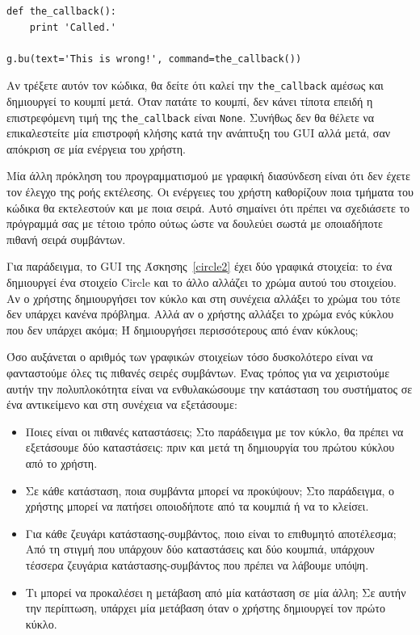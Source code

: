 \documentclass[10pt]{book}
\begin{document}
\begin{verbatim}
def the_callback():
    print 'Called.'

g.bu(text='This is wrong!', command=the_callback())
\end{verbatim}
%
Αν τρέξετε αυτόν τον κώδικα, θα δείτε ότι καλεί την \verb"the_callback" αμέσως και δημιουργεί
το κουμπί μετά.  Όταν πατάτε το κουμπί, δεν κάνει τίποτα επειδή η επιστρεφόμενη τιμή της \verb"the_callback"
είναι {\tt None}. Συνήθως δεν θα θέλετε να επικαλεστείτε μία επιστροφή κλήσης κατά την ανάπτυξη του GUI
αλλά μετά, σαν απόκριση σε μία ενέργεια του χρήστη.

Μία άλλη πρόκληση του προγραμματισμού με γραφική διασύνδεση είναι ότι δεν έχετε τον έλεγχο 
της ροής εκτέλεσης.  Οι ενέργειες του χρήστη καθορίζουν ποια τμήματα του κώδικα θα εκτελεστούν 
και με ποια σειρά.  Αυτό σημαίνει ότι πρέπει να σχεδιάσετε το πρόγραμμά σας με τέτοιο τρόπο
ούτως ώστε να δουλεύει σωστά με οποιαδήποτε πιθανή σειρά συμβάντων.

Για παράδειγμα, το GUI της Άσκησης~\ref{circle2} έχει δύο γραφικά στοιχεία: το ένα δημιουργεί ένα στοιχείο
Circle και το άλλο αλλάζει το χρώμα αυτού του στοιχείου.  Αν ο χρήστης δημιουργήσει τον κύκλο και στη
συνέχεια αλλάξει το χρώμα του τότε δεν υπάρχει κανένα πρόβλημα.  Αλλά αν ο χρήστης αλλάξει το χρώμα ενός
κύκλου που δεν υπάρχει ακόμα;  Ή δημιουργήσει περισσότερους από έναν κύκλους;

Όσο αυξάνεται ο αριθμός των γραφικών στοιχείων τόσο δυσκολότερο είναι να φανταστούμε 
όλες τις πιθανές σειρές συμβάντων.  Ένας τρόπος για να χειριστούμε αυτήν την πολυπλοκότητα
είναι να ενθυλακώσουμε την κατάσταση του συστήματος σε ένα αντικείμενο και στη συνέχεια να εξετάσουμε:

\begin{itemize}

 
\item Ποιες είναι οι πιθανές καταστάσεις;  Στο παράδειγμα με τον κύκλο, θα πρέπει 
να εξετάσουμε δύο καταστάσεις: πριν και μετά τη δημιουργία του πρώτου κύκλου από το 
χρήστη.

\item Σε κάθε κατάσταση, ποια συμβάντα μπορεί να προκύψουν;  Στο παράδειγμα, ο χρήστης 
μπορεί να πατήσει οποιοδήποτε από τα κουμπιά ή να το κλείσει.

\item Για κάθε ζευγάρι κατάστασης-συμβάντος, ποιο είναι το επιθυμητό αποτέλεσμα;   
Από τη στιγμή που υπάρχουν δύο καταστάσεις και δύο κουμπιά, υπάρχουν τέσσερα ζευγάρια
κατάστασης-συμβάντος που πρέπει να λάβουμε υπόψη.

\item Τι μπορεί να προκαλέσει η μετάβαση από μία κατάσταση σε μία άλλη;   
Σε αυτήν την περίπτωση, υπάρχει μία μετάβαση όταν ο χρήστης δημιουργεί τον πρώτο κύκλο.
 

\end{itemize}
\end{document}

